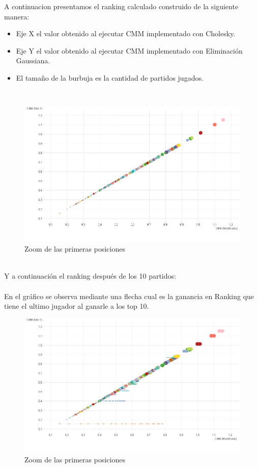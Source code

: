 A continuacion presentamos el ranking calculado construido de la siguiente manera: \\


\begin{itemize}
	\item Eje X el valor obtenido al ejecutar CMM implementado con Cholesky.
	\item Eje Y el valor obtenido al ejecutar CMM implementado con Eliminación Gaussiana.
	\item El tamaño de la burbuja es la cantidad de partidos jugados.
\end{itemize}

\\

\begin{figure}[H]
\centering
\includegraphics[width=1\textwidth]{IMG/comparativa cmm -cmm foto 0.png}
\caption{Zoom de las primeras posiciones}
\label{fig:Zoom de las primeras posiciones}
\end{figure}

\\
Y a continuación el ranking después de los 10 partidos: \\
\\
En el gráfico se observa mediante una flecha cual es la ganancia en Ranking que tiene el ultimo jugador al ganarle a los top 10.\\

\begin{figure}[H]
\centering
\includegraphics[width=1\textwidth]{IMG/comparativa cmm -cmm foto 10.png}
\caption{Zoom de las primeras posiciones}
\label{fig:Zoom de las primeras posiciones}
\end{figure}

